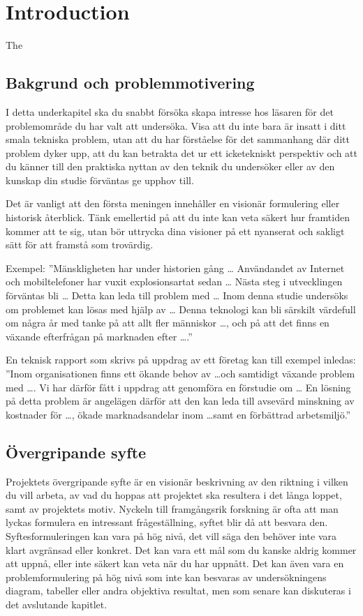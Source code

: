 \chapter{Introduction}
\label{ch:introduction}
\noindent
The 

\section{Bakgrund och problemmotivering}
\label{sec:background}
\noindent
I detta underkapitel ska du snabbt försöka skapa intresse hos läsaren för det 
problemområde du har valt att undersöka.
Visa att du inte bara är insatt i ditt smala tekniska problem, utan att du har 
förståelse för det sammanhang där ditt problem dyker upp, att du kan betrakta 
det ur ett icketekniskt perspektiv och att du känner till den praktiska nyttan 
av den teknik du undersöker eller av den kunskap din studie förväntas ge upphov 
till.

Det är vanligt att den första meningen innehåller en visionär formulering eller 
historisk återblick.
Tänk emellertid på att du inte kan veta säkert hur framtiden kommer att te sig, 
utan bör uttrycka dina visioner på ett nyanserat och sakligt sätt för att 
framstå som trovärdig.

Exempel:
''Mänskligheten har under historien gång \dots
Användandet av Internet och mobiltelefoner har vuxit explosionsartat sedan 
\dots
Nästa steg i utvecklingen förväntas bli \dots
Detta kan leda till problem med \dots
Inom denna studie undersöks om problemet kan lösas med hjälp av \dots
Denna teknologi kan bli särskilt värdefull om några år med tanke på att allt 
fler människor \dots, och på att det finns en växande efterfrågan på marknaden 
efter \dots.''

En teknisk rapport som skrivs på uppdrag av ett företag kan till exempel 
inledas:
''Inom organisationen finns ett ökande behov av \dots och samtidigt växande 
problem med \dots.
Vi har därför fått i uppdrag att genomföra en förstudie om \dots
En lösning på detta problem är angelägen därför att den kan leda till avsevärd 
minskning av kostnader för \dots, ökade marknadsandelar inom \dots samt en 
förbättrad arbetsmiljö.''


\section{Övergripande syfte}
\label{sec:aim}
\noindent
Projektets övergripande syfte är en visionär beskrivning av den riktning 
i vilken du vill arbeta, av vad du hoppas att projektet ska resultera i det 
långa loppet, samt av projektets motiv.
Nyckeln till framgångsrik forskning är ofta att man lyckas formulera en 
intressant frågeställning, syftet blir då att besvara den.
Syftesformuleringen kan vara på hög nivå, det vill säga den behöver inte vara 
klart avgränsad eller konkret.
Det kan vara ett mål som du kanske aldrig kommer att uppnå, eller inte säkert 
kan veta när du har uppnått.
Det kan även vara en problemformulering på hög nivå som inte kan besvaras av 
undersökningens diagram, tabeller eller andra objektiva resultat, men som 
senare kan diskuteras i det avslutande kapitlet.

